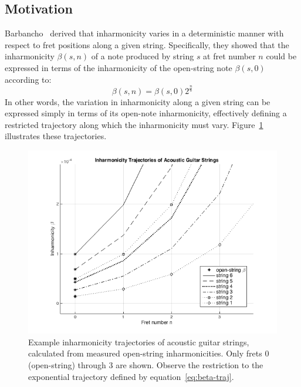 \documentclass[12pt]{cmuthesis}
\begin{document}
\subsection{Motivation}
Barbancho~\cite{barbanchoi2012} derived that inharmonicity varies in a deterministic manner with respect to fret positions along a given string. Specifically, they showed that the inharmonicity $\beta(s,n)$ of a note produced by string $s$ at fret number $n$ could be expressed in terms of the inharmonicity of the open-string note $\beta(s,0)$ according to:
\begin{equation} 
\label{eq:beta-traj}
\beta(s,n) = \beta(s,0)2^{\frac{n}{6}}
\end{equation}
In other words, the variation in inharmonicity along a given string can be expressed simply in terms of its open-note inharmonicity, effectively defining a restricted trajectory along which the inharmonicity must vary. Figure~\ref{fig:beta-trajectories-ag} illustrates these trajectories.

\begin{figure}[h] 
\centering
\includegraphics[scale=0.70]{beta-trajectories-ag}
\caption{Example inharmonicity trajectories of acoustic guitar strings, calculated from measured open-string inharmonicities. Only frets 0 (open-string) through 3 are shown. Observe the restriction to the exponential trajectory defined by equation~\eqref{eq:beta-traj}.}
\label{fig:beta-trajectories-ag}
\end{figure}
\end{document}
